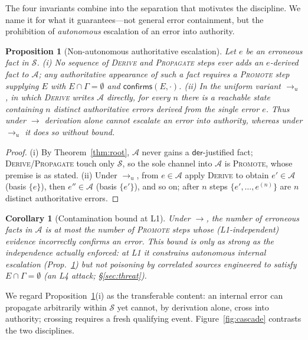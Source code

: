 \documentclass[11pt]{article}
\theoremstyle{plain}
\newtheorem{proposition}[theorem]{Proposition}
\newtheorem{corollary}[theorem]{Corollary}
\theoremstyle{definition}
\newcommand{\Aut}{\mathcal{A}}
\newcommand{\Soft}{\mathcal{S}}
\newcommand{\der}{\mathsf{der}}
\newcommand{\reduces}{\longrightarrow}
\newcommand{\reducesu}{\longrightarrow_{u}}
\begin{document}
The four invariants combine into the separation that motivates the discipline.
We name it for what it guarantees---not general error containment, but the
prohibition of \emph{autonomous} escalation of an error into authority.

\begin{proposition}[Non-autonomous authoritative escalation]
\label{prop:escalation}
Let $e$ be an erroneous fact in $\Soft$. \emph{(i)} No sequence of
\textsc{Derive} and \textsc{Propagate} steps ever adds an $e$-derived fact to
$\Aut$; any authoritative appearance of such a fact requires a \textsc{Promote}
step supplying $E$ with $E\cap\Gamma=\emptyset$ and $\mathsf{confirms}(E,\cdot)$.
\emph{(ii)} In the uniform variant $\reducesu$, in which \textsc{Derive} writes
$\Aut$ directly, for every $n$ there is a reachable state containing $n$ distinct
authoritative errors derived from the single error $e$.
Thus under $\reduces$ derivation alone cannot escalate an error into authority,
whereas under $\reducesu$ it does so without bound.
\end{proposition}
\begin{proof}
(i) By Theorem~\ref{thm:root}, $\Aut$ never gains a $\der$-justified fact;
\textsc{Derive}/\textsc{Propagate} touch only $\Soft$, so the sole channel into
$\Aut$ is \textsc{Promote}, whose premise is as stated. (ii) Under $\reducesu$,
from $e\in\Aut$ apply \textsc{Derive} to obtain $e'\in\Aut$ (basis $\{e\}$), then
$e''\in\Aut$ (basis $\{e'\}$), and so on; after $n$ steps $\{e',\dots,e^{(n)}\}$
are $n$ distinct authoritative errors.
\end{proof}

\begin{corollary}[Contamination bound at L1]
\label{cor:bound}
Under $\reduces$, the number of erroneous facts in $\Aut$ is at most the number of
\textsc{Promote} steps whose (L1-independent) evidence incorrectly confirms an
error. \emph{This bound is only as strong as the independence actually enforced:}
at L1 it constrains autonomous internal escalation (Prop.~\ref{prop:escalation})
but not poisoning by correlated sources engineered to satisfy $E\cap\Gamma=
\emptyset$ (an L4 attack; \S\ref{sec:threat}).
\end{corollary}

We regard Proposition~\ref{prop:escalation}(i) as the transferable content: an
internal error can propagate arbitrarily within $\Soft$ yet cannot, by derivation
alone, cross into authority; crossing requires a fresh qualifying event.
Figure~\ref{fig:cascade} contrasts the two disciplines.
\end{document}
